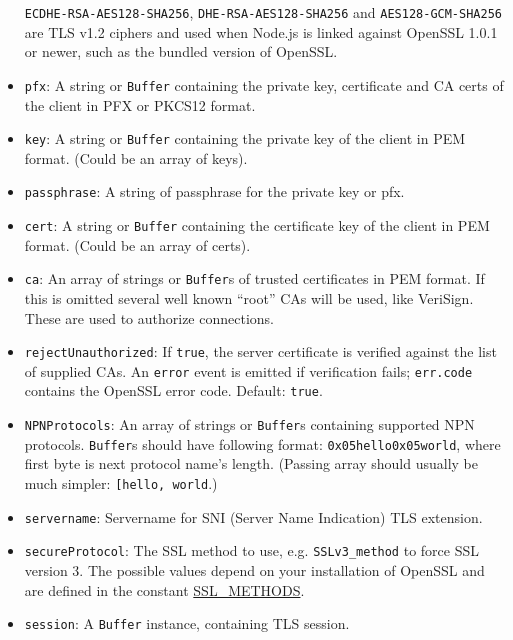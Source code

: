 \begin{itemize}
  \texttt{ECDHE-RSA-AES128-SHA256}, \texttt{DHE-RSA-AES128-SHA256} and
  \texttt{AES128-GCM-SHA256} are TLS v1.2 ciphers and used when Node.js
  is linked against OpenSSL 1.0.1 or newer, such as the bundled version
  of OpenSSL.
\item
  \texttt{pfx}: A string or \texttt{Buffer} containing the private key,
  certificate and CA certs of the client in PFX or PKCS12 format.
\item
  \texttt{key}: A string or \texttt{Buffer} containing the private key
  of the client in PEM format. (Could be an array of keys).
\item
  \texttt{passphrase}: A string of passphrase for the private key or
  pfx.
\item
  \texttt{cert}: A string or \texttt{Buffer} containing the certificate
  key of the client in PEM format. (Could be an array of certs).
\item
  \texttt{ca}: An array of strings or \texttt{Buffer}s of trusted
  certificates in PEM format. If this is omitted several well known
  ``root'' CAs will be used, like VeriSign. These are used to authorize
  connections.
\item
  \texttt{rejectUnauthorized}: If \texttt{true}, the server certificate
  is verified against the list of supplied CAs. An
  \texttt{\textquotesingle{}error\textquotesingle{}} event is emitted if
  verification fails; \texttt{err.code} contains the OpenSSL error code.
  Default: \texttt{true}.
\item
  \texttt{NPNProtocols}: An array of strings or \texttt{Buffer}s
  containing supported NPN protocols. \texttt{Buffer}s should have
  following format: \texttt{0x05hello0x05world}, where first byte is
  next protocol name's length. (Passing array should usually be much
  simpler:
  \texttt{{[}\textquotesingle{}hello\textquotesingle{},\ \textquotesingle{}world\textquotesingle{}{]}}.)
\item
  \texttt{servername}: Servername for SNI (Server Name Indication) TLS
  extension.
\item
  \texttt{secureProtocol}: The SSL method to use, e.g.
  \texttt{SSLv3\_method} to force SSL version 3. The possible values
  depend on your installation of OpenSSL and are defined in the constant
  \href{http://www.openssl.org/docs/ssl/ssl.html\#DEALING_WITH_PROTOCOL_METHODS}{SSL\_METHODS}.
\item
  \texttt{session}: A \texttt{Buffer} instance, containing TLS session.
\end{itemize}

